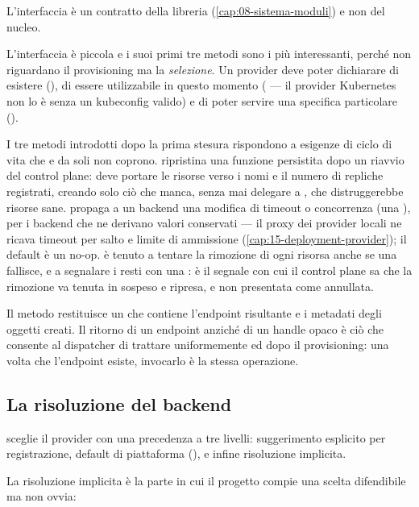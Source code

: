 L'interfaccia \`e un contratto della libreria 
(\cref{cap:08-sistema-moduli}) e non del nucleo.

L'interfaccia \`e piccola e i suoi primi tre metodi sono i pi\`u interessanti,
perch\'e non riguardano il provisioning ma la \emph{selezione}. Un provider deve
poter dichiarare di esistere (), di essere utilizzabile in questo
momento ( --- il provider Kubernetes non lo \`e senza un
kubeconfig valido) e di poter servire una specifica particolare
().

I tre metodi introdotti dopo la prima stesura rispondono a esigenze di ciclo di
vita che  e  da soli non coprono.
 ripristina una funzione persistita dopo un riavvio del control
plane: deve portare le risorse verso i nomi e il numero di repliche registrati,
creando solo ci\`o che manca, senza mai delegare a , che
distruggerebbe risorse sane.  propaga a un backend una modifica
di timeout o concorrenza (una ), per i backend che ne derivano
valori conservati --- il proxy dei provider locali ne ricava timeout per salto e
limite di ammissione (\cref{cap:15-deployment-provider}); il default \`e un
no-op.  \`e tenuto a tentare la rimozione di ogni risorsa anche
se una fallisce, e a segnalare i resti con una
: \`e il segnale con cui il control plane sa
che la rimozione va tenuta in sospeso e ripresa, e non presentata come annullata.

Il metodo  restituisce un  che contiene
l'endpoint risultante e i metadati degli oggetti creati. Il ritorno di un
endpoint anzich\'e di un handle opaco \`e ci\`o che consente al dispatcher di
trattare uniformemente  ed  dopo il
provisioning: una volta che l'endpoint esiste, invocarlo \`e la stessa
operazione.

\subsection{La risoluzione del backend}

 sceglie il provider con una precedenza a tre
livelli: suggerimento esplicito per registrazione, default di piattaforma
(), e infine risoluzione implicita.

La risoluzione implicita \`e la parte in cui il progetto compie una scelta
difendibile ma non ovvia:

